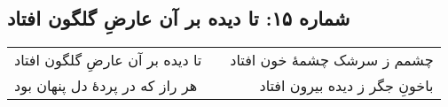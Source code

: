 \begin{center}
\section*{شماره ۱۵: تا دیده بر آن عارضِ گلگون افتاد}
\label{sec:015}
\begin{longtable}{l p{0.5cm} r}
تا دیده بر آن عارضِ گلگون افتاد
&&
چشمم ز سرشک چشمهٔ خون افتاد
\\
هر راز که در پردهٔ دل پنهان بود
&&
باخونِ جگر ز دیده بیرون افتاد
\\
\end{longtable}
\end{center}
